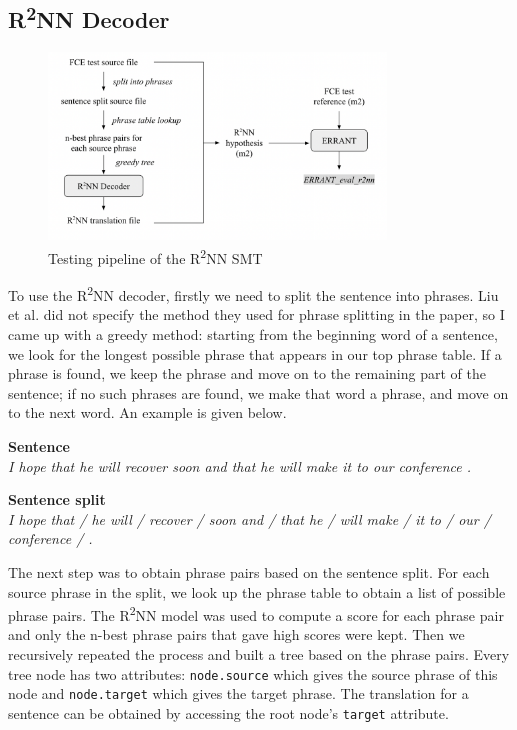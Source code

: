 \documentclass[12pt,a4paper,twoside,openright]{report}
\begin{document}
\subsection{\texorpdfstring{R\textsuperscript{2}NN}{R2NN} Decoder}\label{section:r2nn_test}
\begin{figure}[ht]
\centering
\includegraphics[width=0.8\textwidth]{images/r2nn_test.png}
\caption{Testing pipeline of the R\textsuperscript{2}NN SMT}
\label{fig:r2nn_test}
\end{figure}

To use the R\textsuperscript{2}NN decoder, firstly we need to split the sentence into phrases. Liu et al. did not specify the method they used for phrase splitting in the paper\cite{r2nn}, so I came up with a greedy method: starting from the beginning word of a sentence, we look for the longest possible phrase that appears in our top phrase table. If a phrase is found, we keep the phrase and move on to the remaining part of the sentence; if no such phrases are found, we make that word a phrase, and move on to the next word. An example is given below.

\textbf{Sentence}\\
\textit{I hope that he will recover soon and that he will make it to our conference .}

\textbf{Sentence split}\\
\textit{I hope that / he will / recover / soon and / that he / will make / it to / our / conference / .}

The next step was to obtain phrase pairs based on the sentence split. For each source phrase in the split, we look up the phrase table to obtain a list of possible phrase pairs. The R\textsuperscript{2}NN model was used to compute a score for each phrase pair and only the n-best phrase pairs that gave high scores were kept. Then we recursively repeated the process and built a tree based on the phrase pairs. Every tree node has two attributes: \texttt{node.source} which gives the source phrase of this node and \texttt{node.target} which gives the target phrase. The translation for a sentence can be obtained by accessing the root node's \texttt{target} attribute.
\end{document}
